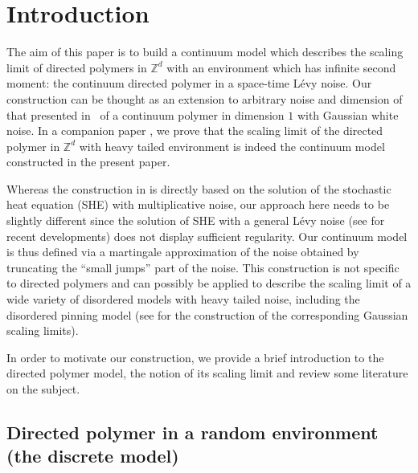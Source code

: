 \documentclass[11pt]{article}
\newcommand{\Subsection}{\subsection}
\numberwithin{equation}{section}
\theoremstyle{definition}
\newcommand{\bbZ}{{\ensuremath{\mathbb Z}} }
\begin{document}
\section{Introduction}

The aim of this paper is to build a continuum model which describes the scaling limit of directed polymers in $\bbZ^d$ with an environment which has infinite second moment:
the continuum directed polymer in a space-time Lévy noise.
Our construction can be thought as an extension to arbitrary noise and dimension of that presented in~\cite{AKQ14b} of a continuum polymer in dimension $1$ with Gaussian white noise.
In a companion paper \cite{BL20_disc}, we prove that the scaling limit of the directed polymer in $\bbZ^d$ with heavy tailed environment is indeed the continuum model constructed in the present paper.

Whereas the construction in \cite{AKQ14b} is directly based on the solution of the stochastic heat equation (SHE) with multiplicative noise, our approach here needs to be slightly different since the solution of SHE with a general Lévy noise (see \cite{Chong17} for recent developments) does not display sufficient regularity. Our continuum model is thus defined via a martingale approximation of the noise obtained by truncating the ``small jumps'' part of the noise. This construction is not specific to directed polymers and can possibly be applied to describe the scaling limit of a wide variety of disordered models with heavy tailed noise, including the disordered pinning model (see \cite{CSZ14,CSZ13} for the construction of the corresponding Gaussian scaling limits).

In order to motivate our construction, we provide a brief introduction to the directed polymer model, the notion of its scaling limit and review some literature on the subject.

\Subsection{Directed polymer in a random environment (the discrete model)}
\label{sec:discrete}
\end{document}
